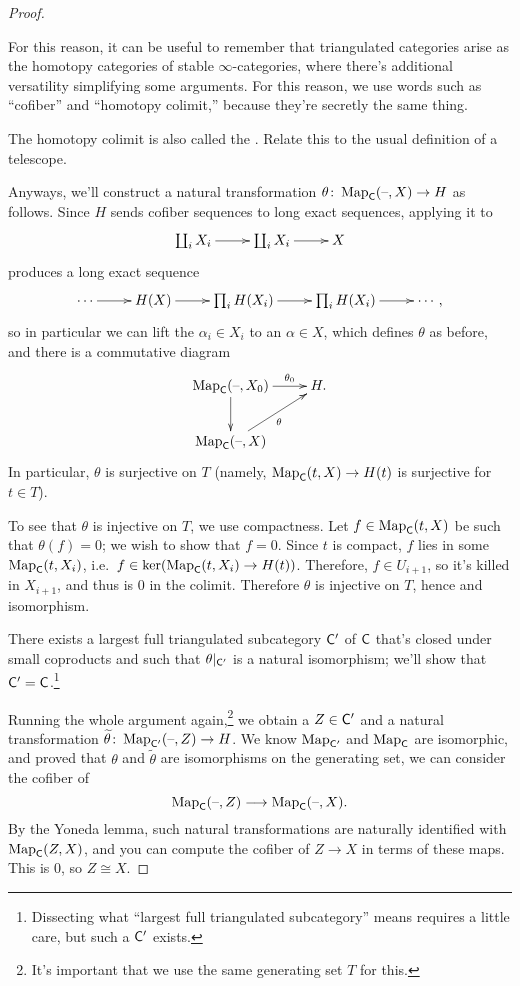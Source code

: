 \begin{proof}
\begin{rem}
For this reason, it can be useful to remember that triangulated categories arise as the homotopy categories of
stable $\infty$-categories, where there's additional versatility simplifying some arguments. For this reason, we
use words such as ``cofiber'' and ``homotopy colimit,'' because they're secretly the same thing. %
\end{rem}
\begin{ex}
The homotopy colimit is also called the . Relate this to the
usual definition of a telescope.
\end{ex}
Anyways, we'll construct a natural transformation $\theta\colon\operatorname{Map}_\mathsf C(\text{--},X)\to H$ as follows. Since $H$ sends
cofiber sequences to long exact sequences, applying it to
\[\xymatrix{
	\coprod_i X_i\ar[r] & \coprod_i X_i\ar[r] & X
}\]
produces a long exact sequence
\[\xymatrix{
	\dotsb\ar[r] & H(X)\ar[r] & \prod_i H(X_i)\ar[r] & \prod_i H(X_i)\ar[r] & \dotsb,
}\]
so in particular we can lift the $\alpha_i\in X_i$ to an $\alpha\in X$, which defines $\theta$ as before, and there
is a commutative diagram
\[\xymatrix{
	\Map_\fC(\bl,X_0)\ar[r]^-{\theta_0}\ar[d] & H.\\
	\Map_\fC(\bl,X)\ar[ur]_{\theta}
}\]
In particular, $\theta$ is surjective on $T$ (namely, $\operatorname{Map}_\mathsf C(t,X)\to H(t)$ is surjective for $t\in T$).

To see that $\theta$ is injective on $T$, we use compactness. Let $f\in\operatorname{Map}_\mathsf C(t,X)$ be such that $\theta(f) = 0$;
we wish to show that $f = 0$. Since $t$ is compact, $f$ lies in some $\operatorname{Map}_\mathsf C(t,X_i)$, i.e.\
$f\in\ker(\operatorname{Map}_\mathsf C(t,X_i)\to H(t))$. Therefore, $f\in U_{i+1}$, so it's killed in $X_{i+1}$, and thus is $0$ in the
colimit. Therefore $\theta$ is injective on $T$, hence and isomorphism.

There exists a largest full triangulated subcategory $\mathsf C'$ of $\mathsf C$ that's closed under small coproducts
and such that $\theta|_{\mathsf C'}$ is a natural isomorphism; we'll show that $\mathsf C' =
\mathsf C$.\footnote{Dissecting what ``largest full triangulated subcategory'' means requires a little care, but such a
$\mathsf C'$ exists.}

Running the whole argument again,\footnote{It's important that we use the same generating set $T$ for this.} we
obtain a $Z\in\mathsf C'$ and a natural transformation $\widetilde\theta\colon\operatorname{Map}_{\mathsf C'}(\text{--},Z)\to H$.  We know
$\operatorname{Map}_{\mathsf C'}$ and $\operatorname{Map}_\mathsf C$ are isomorphic, and proved that $\theta$ and $\widetilde\theta$ are isomorphisms on
the generating set, we can consider the cofiber of
\[\operatorname{Map}_\mathsf C(\text{--},Z)\longrightarrow\operatorname{Map}_\mathsf C(\text{--},X).\]
By the Yoneda lemma, such natural transformations are naturally identified with
$\operatorname{Map}_\mathsf C(Z,X)$, and you can compute the cofiber of $Z\to X$ in terms of these maps. This is $0$, so $Z\cong X$.


\end{proof}
